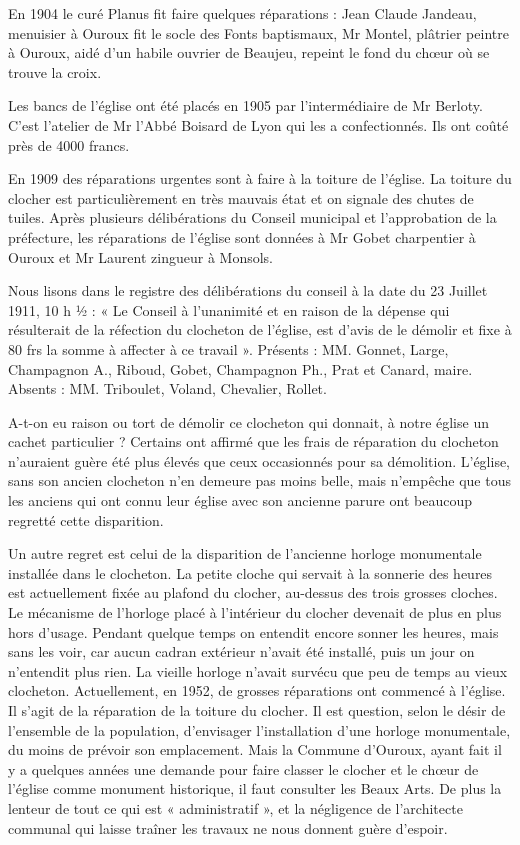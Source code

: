 En 1904 le curé Planus fit faire quelques réparations : Jean Claude Jandeau, menuisier à Ouroux fit le socle des Fonts baptismaux, Mr Montel, plâtrier peintre à Ouroux, aidé d'un habile ouvrier de Beaujeu, repeint le fond du chœur où se trouve la croix.

Les bancs de l'église ont été placés en 1905 par l'intermédiaire de Mr Berloty. C'est l'atelier de Mr l'Abbé Boisard de Lyon qui les a confectionnés. Ils ont coûté près de 4000 francs.

En 1909 des réparations urgentes sont à faire à la toiture de l'église. La toiture du clocher est particulièrement en très mauvais état et on signale des chutes de tuiles. Après plusieurs délibérations du Conseil municipal et l'approbation de la préfecture, les réparations de l'église sont données à Mr Gobet charpentier à Ouroux et Mr Laurent zingueur à Monsols.

Nous lisons dans le registre des délibérations du conseil à la date du 23 Juillet 1911, 10 h ½ : « Le Conseil à l'unanimité et en raison de la dépense qui résulterait de la réfection du clocheton de l'église, est d'avis de le démolir et fixe à 80 frs la somme à affecter à ce travail ». Présents : MM. Gonnet, Large, Champagnon A., Riboud, Gobet, Champagnon Ph., Prat et Canard, maire. Absents : MM. Triboulet, Voland, Chevalier, Rollet.

A-t-on eu raison ou tort de démolir ce clocheton qui donnait, à notre église un cachet particulier ? Certains ont affirmé que les
frais de réparation du clocheton n'auraient guère été plus élevés que ceux occasionnés pour sa démolition. L'église, sans son ancien clocheton n'en demeure pas moins belle, mais n'empêche que tous les anciens qui ont connu leur église avec son ancienne parure ont beaucoup regretté cette disparition.

Un autre regret est celui de la disparition de l'ancienne horloge monumentale installée dans le clocheton. La petite cloche qui servait à la sonnerie des heures est actuellement fixée au plafond du clocher, au-dessus des trois grosses cloches. Le mécanisme de l'horloge placé à l'intérieur du clocher devenait de plus en plus hors d'usage. Pendant quelque temps on entendit encore sonner les heures, mais sans les voir, car aucun cadran extérieur n'avait été installé, puis un jour on n'entendit plus rien. La vieille horloge n'avait survécu que peu de temps au vieux clocheton. Actuellement, en 1952, de grosses réparations ont commencé à l'église. Il s'agit de la réparation de la toiture du clocher. Il est question, selon le désir de l'ensemble de la population, d'envisager l'installation d'une horloge monumentale, du moins de prévoir son emplacement. Mais la Commune d'Ouroux, ayant fait il y a quelques années une demande pour faire classer le clocher et le chœur de l'église comme monument historique, il faut consulter les Beaux Arts. De plus la lenteur de tout ce qui est « administratif », et la négligence de l'architecte communal qui laisse traîner les travaux ne nous donnent guère d'espoir.

